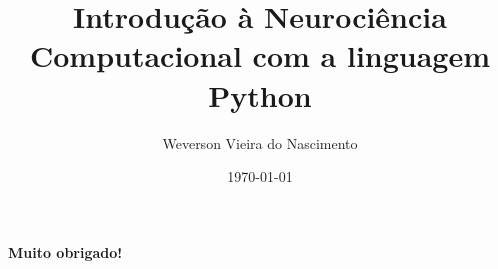 \documentclass[aspectratio=169]{beamer}
\title[Dissertação de Mestrado]{Introdução à Neurociência Computacional com a linguagem Python} %
\author[Weverson Nascimento]{Weverson Vieira do Nascimento} %
\institute[UFPA] %
{Orientador: Prof. Dr. Antonio Pereira Junior\\
	\medskip
Universidade Federal do Pará \\ %
Programa de Pós-graduação em Engenharia Elétrica \\
\medskip
\href{mailto:weverson@ufpa.br}{\textit{weverson@ufpa.br}}
}
\date{\today} %
\begin{document}









\section*{}
\begin{frame}[noframenumbering]
\centering
\textbf{Muito obrigado!}
\end{frame}

\end{document}
